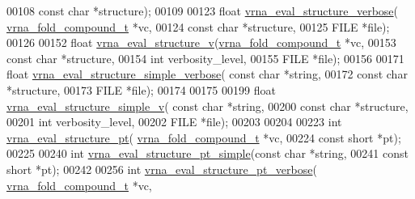 \begin{DoxyCode}
00108                                   \textcolor{keyword}{const} \textcolor{keywordtype}{char} *structure);
00109 
00123 \textcolor{keywordtype}{float} \hyperlink{eval_8h_a0928d699d310178f84ee2351034e5cb5}{vrna\_eval\_structure\_verbose}(
      \hyperlink{group__fold__compound_structvrna__fc__s}{vrna\_fold\_compound\_t} *vc,
00124                                   \textcolor{keyword}{const} \textcolor{keywordtype}{char} *structure,
00125                                   FILE *file);
00126 
00152 \textcolor{keywordtype}{float} \hyperlink{eval_8h_ab12e6b1226227670322150df018734f8}{vrna\_eval\_structure\_v}(\hyperlink{group__fold__compound_structvrna__fc__s}{vrna\_fold\_compound\_t} *vc,
00153                             \textcolor{keyword}{const} \textcolor{keywordtype}{char} *structure,
00154                             \textcolor{keywordtype}{int} verbosity\_level,
00155                             FILE *file);
00156 
00171 \textcolor{keywordtype}{float} \hyperlink{eval_8h_a4c2895a7dcd756ef2dc7f76db7c4c53e}{vrna\_eval\_structure\_simple\_verbose}( \textcolor{keyword}{const} \textcolor{keywordtype}{char} *\textcolor{keywordtype}{string},
00172                                           \textcolor{keyword}{const} \textcolor{keywordtype}{char} *structure,
00173                                           FILE *file);
00174 
00175 
00199 \textcolor{keywordtype}{float} \hyperlink{eval_8h_addb30ac265f1a39557170e7acac4930f}{vrna\_eval\_structure\_simple\_v}( \textcolor{keyword}{const} \textcolor{keywordtype}{char} *\textcolor{keywordtype}{string},
00200                                     \textcolor{keyword}{const} \textcolor{keywordtype}{char} *structure,
00201                                     \textcolor{keywordtype}{int} verbosity\_level,
00202                                     FILE *file);
00203 
00204 
00223 \textcolor{keywordtype}{int} \hyperlink{eval_8h_adbd09372ddfd7a450bbd590c96a6bfe4}{vrna\_eval\_structure\_pt}( \hyperlink{group__fold__compound_structvrna__fc__s}{vrna\_fold\_compound\_t} *vc,
00224                             \textcolor{keyword}{const} \textcolor{keywordtype}{short} *pt);
00225 
00240 \textcolor{keywordtype}{int} \hyperlink{eval_8h_a0bba59b4d6e53461088666ff4aece7b0}{vrna\_eval\_structure\_pt\_simple}(\textcolor{keyword}{const} \textcolor{keywordtype}{char} *\textcolor{keywordtype}{string},
00241                                   \textcolor{keyword}{const} \textcolor{keywordtype}{short} *pt);
00242 
00256 \textcolor{keywordtype}{int} \hyperlink{eval_8h_a8a517cfeeae8c376ae7b1e0c401d38b4}{vrna\_eval\_structure\_pt\_verbose}( 
      \hyperlink{group__fold__compound_structvrna__fc__s}{vrna\_fold\_compound\_t} *vc,

\end{DoxyCode}
